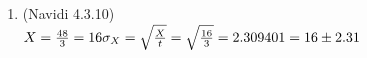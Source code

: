 \documentclass[11pt]{article}
\begin{document}
\begin{preview}
\begin{enumerate}
\item (Navidi 4.3.10) \\
$X = \frac{48}{3} = 16\\
\sigma_X = \sqrt{\frac{X}{t}} = \sqrt{\frac{16}{3}} =2.309401\\
= 16 \pm 2.31$

\end{enumerate}
\end{preview}
\end{document}
